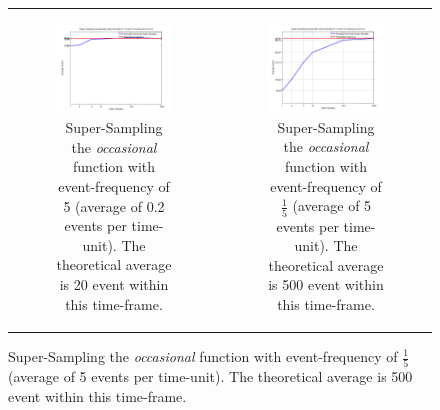 \begin{figure}
\begin{center}
	\begin{tabular}{c c}
		\begin{subfigure}[b]{0.5\textwidth}
			\centering
			\includegraphics[width=.6\textwidth, angle=0]{./../shared/fig/samplingTest_occasionally_ss_02evts.png}
			\caption{Super-Sampling the \textit{occasional} function with event-frequency of 5 (average of 0.2 events per time-unit). The theoretical average is 20 event within this time-frame.}
			\label{fig:sampling_occasionally_ss_02evts}
		\end{subfigure}
	
		&
		
		\begin{subfigure}[b]{0.5\textwidth}
			\centering
			\includegraphics[width=.6\textwidth, angle=0]{./../shared/fig/samplingTest_occasionally_ss_5evts.png}
			\caption{Super-Sampling the \textit{occasional} function with event-frequency of $\frac{1}{5}$ (average of 5 events per time-unit). The theoretical average is 500 event within this time-frame.}
			\label{fig:sampling_occasionally_ss_5evts}
		\end{subfigure}

		\\
		

\end{tabular}
\end{center}
\end{figure}
